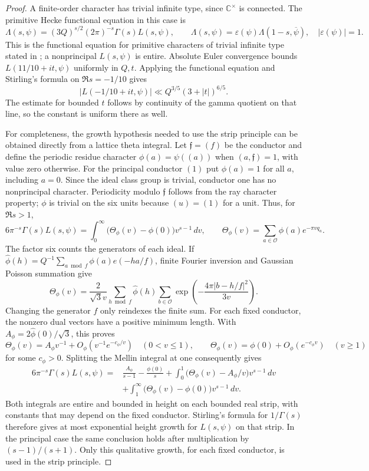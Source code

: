 \documentclass[11pt,a4paper]{article}
\numberwithin{equation}{section}
\numberwithin{figure}{section}
\theoremstyle{definition}
\theoremstyle{remark}
\begin{document}
\begin{proof}
A finite-order character has trivial infinite type, since $\mathbb C^\times$
is connected.  The primitive Hecke functional equation in this case is
\[
 \Lambda(s,\psi)=(3Q)^{s/2}(2\pi)^{-s}\Gamma(s)L(s,\psi),\qquad
 \Lambda(s,\psi)=\varepsilon(\psi)\Lambda(1-s,\overline\psi),
 \quad |\varepsilon(\psi)|=1.
\]
This is the functional equation for primitive characters of trivial infinite
type stated in \cite[Equation (1.1)]{GZ}; a nonprincipal $L(s,\psi)$ is
entire.  Absolute Euler convergence bounds $L(11/10+it,\psi)$ uniformly in
$Q,t$.  Applying the functional equation and Stirling's formula on
$\Re s=-1/10$ gives
\[
 |L(-1/10+it,\psi)|\ll Q^{3/5}(3+|t|)^{6/5}.
\]
The estimate for bounded $t$ follows by continuity of the gamma quotient on
that line, so the constant is uniform there as well.

For completeness, the growth hypothesis needed to use the strip principle
can be obtained directly from a lattice theta integral.  Let
$\mathfrak f=(f)$ be the conductor and define the periodic residue character
$\phi(a)=\psi((a))$ when $(a,\mathfrak f)=1$, with value zero otherwise.
For the principal conductor $(1)$ put $\phi(a)=1$ for all $a$, including
$a=0$.  Since the ideal class group is trivial, conductor one has no
nonprincipal character.  Periodicity modulo $\mathfrak f$ follows from the ray character
property; $\phi$ is trivial on the six units because $(u)=(1)$ for a unit.
Thus, for $\Re s>1$,
\[
 6\pi^{-s}\Gamma(s)L(s,\psi)
 =\int_0^\infty\bigl(\Theta_\phi(v)-\phi(0)\bigr)v^{s-1}\,dv,
 \qquad
 \Theta_\phi(v)=\sum_{a\in\mathcal O}\phi(a)e^{-\pi vq_a}.
\]
The factor six counts the generators of each ideal.  If
$\widehat\phi(h)=Q^{-1}\sum_{a\bmod f}\phi(a)e(-ha/f)$,
finite Fourier inversion and Gaussian Poisson summation give
\[
 \Theta_\phi(v)=\frac{2}{\sqrt3v}
 \sum_{h\bmod f}\widehat\phi(h)
 \sum_{b\in\mathcal O}
    \exp\left(-\frac{4\pi|b-h/f|^2}{3v}\right).
\]
Changing the generator $f$ only reindexes the finite sum.  For each fixed
conductor, the nonzero dual vectors have a positive minimum length.  With
$A_\phi=2\widehat\phi(0)/\sqrt3$, this proves
\[
 \Theta_\phi(v)=A_\phi v^{-1}+O_\phi(v^{-1}e^{-c_\phi/v})\quad(0<v\le1),
 \qquad
 \Theta_\phi(v)=\phi(0)+O_\phi(e^{-c_\phi v})\quad(v\ge1)
\]
for some $c_\phi>0$.  Splitting the Mellin integral at one consequently gives
\[
 \begin{split}
 6\pi^{-s}\Gamma(s)L(s,\psi)
 ={}&\frac{A_\phi}{s-1}-\frac{\phi(0)}s
 +\int_0^1\bigl(\Theta_\phi(v)-A_\phi/v\bigr)v^{s-1}\,dv\\
 &+\int_1^\infty\bigl(\Theta_\phi(v)-\phi(0)\bigr)v^{s-1}\,dv.
 \end{split}
\]
Both integrals are entire and bounded in height on each bounded real strip,
with constants that may depend on the fixed conductor.  Stirling's formula
for $1/\Gamma(s)$ therefore gives at most exponential height growth for
$L(s,\psi)$ on that strip.  In the principal case the same conclusion holds
after multiplication by $(s-1)/(s+1)$.  Only this qualitative growth, for
each fixed conductor, is used in the strip principle.


\end{proof}
\end{document}
